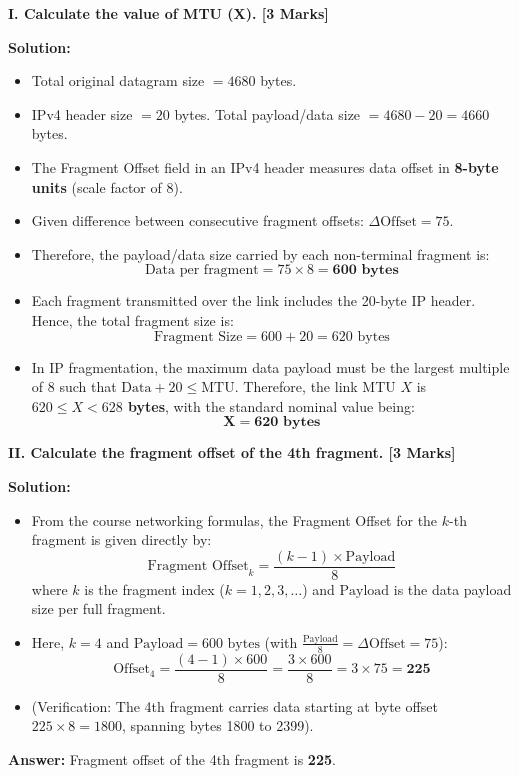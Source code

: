 \documentclass[11pt,a4paper]{article}
\begin{document}
\textbf{I. Calculate the value of MTU (X). [3 Marks]}

\textbf{Solution:}
\begin{itemize}
    \item Total original datagram size $= 4680$ bytes.
    \item IPv4 header size $= 20$ bytes. Total payload/data size $= 4680 - 20 = 4660$ bytes.
    \item The Fragment Offset field in an IPv4 header measures data offset in \textbf{8-byte units} (scale factor of 8).
    \item Given difference between consecutive fragment offsets: $\Delta \text{Offset} = 75$.
    \item Therefore, the payload/data size carried by each non-terminal fragment is:
    \[
    \text{Data per fragment} = 75 \times 8 = \mathbf{600\text{ bytes}}
    \]
    \item Each fragment transmitted over the link includes the 20-byte IP header. Hence, the total fragment size is:
    \[
    \text{Fragment Size} = 600 + 20 = 620\text{ bytes}
    \]
    \item In IP fragmentation, the maximum data payload must be the largest multiple of 8 such that $\text{Data} + 20 \le \text{MTU}$. Therefore, the link MTU $X$ is \textbf{$620 \le X < 628$ bytes}, with the standard nominal value being:
    \[
    \mathbf{X = 620\text{ bytes}}
    \]
\end{itemize}

\textbf{II. Calculate the fragment offset of the 4th fragment. [3 Marks]}

\textbf{Solution:}
\begin{itemize}
    \item From the course networking formulas, the Fragment Offset for the $k$-th fragment is given directly by:
    \[
    \text{Fragment Offset}_k = \frac{(k - 1) \times \text{Payload}}{8}
    \]
    where $k$ is the fragment index ($k = 1, 2, 3, \dots$) and $\text{Payload}$ is the data payload size per full fragment.
    \item Here, $k = 4$ and $\text{Payload} = 600\text{ bytes}$ (with $\frac{\text{Payload}}{8} = \Delta\text{Offset} = 75$):
    \[
    \text{Offset}_4 = \frac{(4 - 1) \times 600}{8} = \frac{3 \times 600}{8} = 3 \times 75 = \mathbf{225}
    \]
    \item (Verification: The 4th fragment carries data starting at byte offset $225 \times 8 = 1800$, spanning bytes 1800 to 2399).
\end{itemize}
\textbf{Answer:} Fragment offset of the 4th fragment is \textbf{225}.
\end{document}
